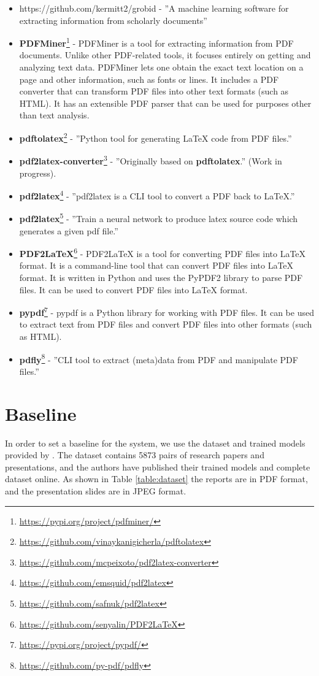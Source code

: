 \begin{itemize}
    \item https://github.com/kermitt2/grobid - ''A machine learning software for extracting information from scholarly documents''
    \item \textbf{PDFMiner}\footnote{\url{https://pypi.org/project/pdfminer/}} - PDFMiner is a tool for extracting information from PDF documents. Unlike other PDF-related tools, it focuses entirely on getting and analyzing text data. PDFMiner lets one obtain the exact text location on a page and other information, such as fonts or lines. It includes a PDF converter that can transform PDF files into other text formats (such as HTML). It has an extensible PDF parser that can be used for purposes other than text analysis.
    \item \textbf{pdftolatex}\footnote{\url{https://github.com/vinaykanigicherla/pdftolatex}} - ''Python tool for generating \LaTeX{} code from PDF files.''
    \item \textbf{pdf2latex-converter}\footnote{\url{https://github.com/mcpeixoto/pdf2latex-converter}} - ''Originally based on \textbf{pdftolatex}.'' (Work in progress).
    \item \textbf{pdf2latex}\footnote{\url{https://github.com/emsquid/pdf2latex}} - ''pdf2latex is a CLI tool to convert a PDF back to LaTeX.''
    \item \textbf{pdf2latex}\footnote{\url{https://github.com/safnuk/pdf2latex}} - ''Train a neural network to produce latex source code which generates a given pdf file.''
    \item \textbf{PDF2LaTeX}\footnote{\url{https://github.com/senyalin/PDF2LaTeX}} - PDF2LaTeX is a tool for converting PDF files into \LaTeX{} format. It is a command-line tool that can convert PDF files into \LaTeX{} format. It is written in Python and uses the PyPDF2 library to parse PDF files. It can be used to convert PDF files into \LaTeX{} format.
    \item \textbf{pypdf}\footnote{\url{https://pypi.org/project/pypdf/}} - pypdf is a Python library for working with PDF files. It can be used to extract text from PDF files and convert PDF files into other formats (such as HTML).
    \item \textbf{pdfly}\footnote{\url{https://github.com/py-pdf/pdfly}} - ''CLI tool to extract (meta)data from PDF and manipulate PDF files.''
\end{itemize}

\section{Baseline}
In order to set a baseline for the system, we use the dataset and trained models provided by \citep{Fu:2022:AAAI}. The dataset contains 5873 pairs of research papers and presentations, and the authors have published their trained models and complete dataset online. As shown in Table \ref{table:dataset} the reports are in PDF format, and the presentation slides are in JPEG format. 

